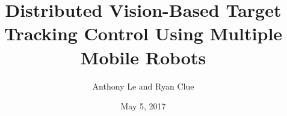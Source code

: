 \documentclass[12pt,oneside]{book}
\begin{document}
    \onehalfspace
	
    \title{Distributed Vision-Based Target Tracking Control Using Multiple Mobile Robots} 
    \author{Anthony Le and Ryan Clue}
    
    \date{May 5, 2017} 
    
    
    
    

    \frontmatter
    \maketitle
    
    
    
    

    \cleardoublepage
     {} 
    \tableofcontents
    
    \listoffigures

    \cleardoublepage
    \mainmatter
    
    
    
    
    
    
    
    
    \cleardoublepage
    	{}										
    
\end{document}
